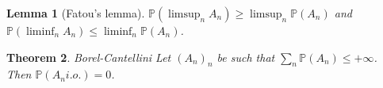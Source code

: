 \documentclass{article}
\newtheorem{theorem}{Theorem}
\newtheorem{lemma}[theorem]{Lemma}
\theoremstyle{definition}
\numberwithin{theorem}{section}
\numberwithin{equation}{section}
\begin{document}
\begin{lemma}[Fatou's lemma]
	$\mathbb{P}(\limsup_n A_n) \geq \limsup_n \mathbb{P}(A_n)$ and $\mathbb{P}(\liminf_n A_n) \leq \liminf_n \mathbb{P}(A_n)$.
\end{lemma}

\begin{theorem}
	Borel-Cantellini
	Let $(A_n)_n$ be such that $\sum_n \mathbb{P}(A_n) \leq +\infty$. Then $\mathbb{P}(A_n i.o.) = 0$. 
\end{theorem}
\end{document}
